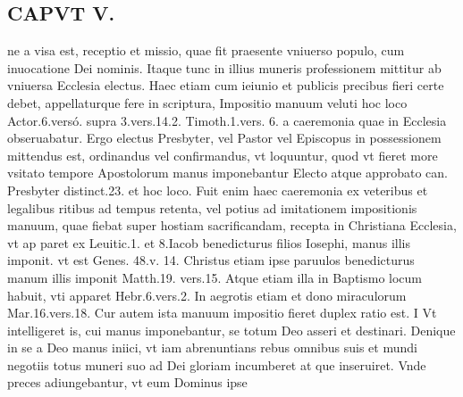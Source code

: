 \documentclass{article}
\begin{document}
\begin{pages}
\section*{CAPVT  V. }
\marginpar{[ p.359 ]}\pstart ne a visa est, receptio et missio, quae fit praesente vniuerso populo, cum inuocatione Dei nominis. Itaque tunc in illius muneris professionem mittitur ab vniuersa Ecclesia electus. Haec etiam cum ieiunio et publicis precibus fieri certe debet, appellaturque fere in scriptura, Impositio manuum veluti hoc loco Actor.6.versó. supra 3.vers.14.2. Timoth.1.vers. 6. a caeremonia quae in Ecclesia obseruabatur. Ergo electus Presbyter, vel Pastor vel Episcopus in possessionem mittendus est, ordinandus vel confirmandus, vt loquuntur, quod vt fieret more vsitato tempore Apostolorum manus imponebantur Electo atque approbato can. Presbyter distinct.23. et hoc loco. Fuit enim haec caeremonia ex veteribus et legalibus ritibus ad tempus retenta, vel potius ad imitationem impositionis manuum, quae fiebat super hostiam sacrificandam, recepta in Christiana Ecclesia, vt ap paret ex Leuitic.1. et 8.Iacob benedicturus filios Iosephi, manus illis imponit. vt est Genes. 48.v. 14. Christus etiam ipse paruulos benedicturus manum illis imponit Matth.19. vers.15. Atque etiam illa in Baptismo locum habuit, vti apparet Hebr.6.vers.2. In aegrotis etiam et dono miraculorum Mar.16.vers.18.  \pend\pstart Cur autem ista manuum impositio fieret duplex ratio est.  \pend\pstart I Vt intelligeret is, cui manus imponebantur, se totum Deo asseri et destinari. Denique in se a Deo manus iniici, vt iam abrenuntians rebus omnibus suis et mundi negotiis totus muneri suo ad Dei gloriam incumberet at que inseruiret. Vnde preces adiungebantur, vt eum Dominus ipse  \pend

\end{pages}
\end{document}
